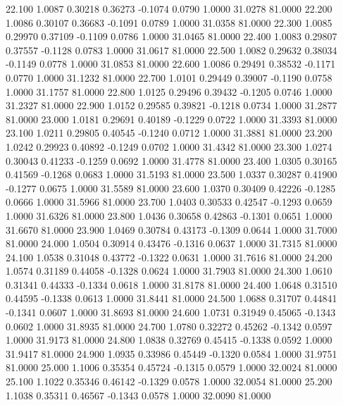   22.100   1.0087   0.30218   0.36273  -0.1074   0.0790   1.0000  31.0278  81.0000
  22.200   1.0086   0.30107   0.36683  -0.1091   0.0789   1.0000  31.0358  81.0000
  22.300   1.0085   0.29970   0.37109  -0.1109   0.0786   1.0000  31.0465  81.0000
  22.400   1.0083   0.29807   0.37557  -0.1128   0.0783   1.0000  31.0617  81.0000
  22.500   1.0082   0.29632   0.38034  -0.1149   0.0778   1.0000  31.0853  81.0000
  22.600   1.0086   0.29491   0.38532  -0.1171   0.0770   1.0000  31.1232  81.0000
  22.700   1.0101   0.29449   0.39007  -0.1190   0.0758   1.0000  31.1757  81.0000
  22.800   1.0125   0.29496   0.39432  -0.1205   0.0746   1.0000  31.2327  81.0000
  22.900   1.0152   0.29585   0.39821  -0.1218   0.0734   1.0000  31.2877  81.0000
  23.000   1.0181   0.29691   0.40189  -0.1229   0.0722   1.0000  31.3393  81.0000
  23.100   1.0211   0.29805   0.40545  -0.1240   0.0712   1.0000  31.3881  81.0000
  23.200   1.0242   0.29923   0.40892  -0.1249   0.0702   1.0000  31.4342  81.0000
  23.300   1.0274   0.30043   0.41233  -0.1259   0.0692   1.0000  31.4778  81.0000
  23.400   1.0305   0.30165   0.41569  -0.1268   0.0683   1.0000  31.5193  81.0000
  23.500   1.0337   0.30287   0.41900  -0.1277   0.0675   1.0000  31.5589  81.0000
  23.600   1.0370   0.30409   0.42226  -0.1285   0.0666   1.0000  31.5966  81.0000
  23.700   1.0403   0.30533   0.42547  -0.1293   0.0659   1.0000  31.6326  81.0000
  23.800   1.0436   0.30658   0.42863  -0.1301   0.0651   1.0000  31.6670  81.0000
  23.900   1.0469   0.30784   0.43173  -0.1309   0.0644   1.0000  31.7000  81.0000
  24.000   1.0504   0.30914   0.43476  -0.1316   0.0637   1.0000  31.7315  81.0000
  24.100   1.0538   0.31048   0.43772  -0.1322   0.0631   1.0000  31.7616  81.0000
  24.200   1.0574   0.31189   0.44058  -0.1328   0.0624   1.0000  31.7903  81.0000
  24.300   1.0610   0.31341   0.44333  -0.1334   0.0618   1.0000  31.8178  81.0000
  24.400   1.0648   0.31510   0.44595  -0.1338   0.0613   1.0000  31.8441  81.0000
  24.500   1.0688   0.31707   0.44841  -0.1341   0.0607   1.0000  31.8693  81.0000
  24.600   1.0731   0.31949   0.45065  -0.1343   0.0602   1.0000  31.8935  81.0000
  24.700   1.0780   0.32272   0.45262  -0.1342   0.0597   1.0000  31.9173  81.0000
  24.800   1.0838   0.32769   0.45415  -0.1338   0.0592   1.0000  31.9417  81.0000
  24.900   1.0935   0.33986   0.45449  -0.1320   0.0584   1.0000  31.9751  81.0000
  25.000   1.1006   0.35354   0.45724  -0.1315   0.0579   1.0000  32.0024  81.0000
  25.100   1.1022   0.35346   0.46142  -0.1329   0.0578   1.0000  32.0054  81.0000
  25.200   1.1038   0.35311   0.46567  -0.1343   0.0578   1.0000  32.0090  81.0000
